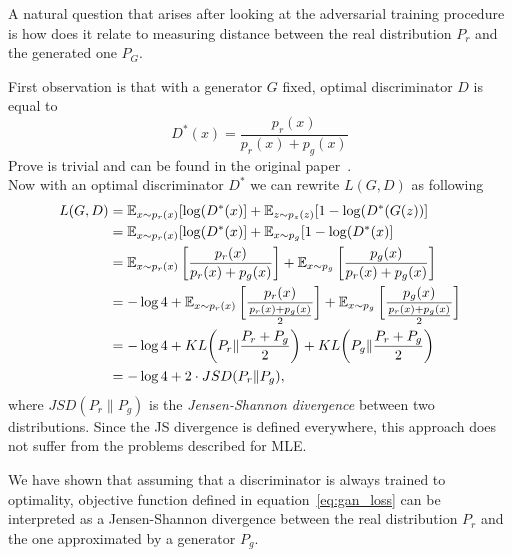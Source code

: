 \indent A natural question that arises after looking at the adversarial training procedure is how does it relate to measuring distance between the real distribution $P_r$ and the generated one $P_G$. 

First observation is that with a generator $G$ fixed, optimal discriminator $D$ is equal to
\begin{equation}
	D^*(x) = \frac{p_r(x)}{p_r(x) + p_g(x)}
\end{equation}
Prove is trivial and can be found in the original paper~\citep{gan}.\\
Now with an optimal discriminator $D^*$ we can rewrite $L(G,D)$ as following
\begin{align*}
	L(G, D) &= \operatorname{\mathbb{E}}_{x \sim p_r(x)} [\log(D^*(x)] + \operatorname{\mathbb{E}}_{z \sim p_z(z)}[1-\log(D^*(G(z))] \\
	&= \operatorname{\mathbb{E}}_{x \sim p_r(x)} [\log(D^*(x)] + \operatorname{\mathbb{E}}_{x \sim p_g}[1-\log(D^*(x)] \\
	&= \operatorname{\mathbb{E}}_{x \sim p_r(x)} \bigg[\frac{p_r(x)}{p_r(x) + p_g(x)}\bigg] + \operatorname{\mathbb{E}}_{x \sim p_g}\bigg[\frac{p_g(x)}{p_r(x) + p_g(x)}\bigg] \\
	&= -\log 4 + \operatorname{\mathbb{E}}_{x \sim p_r(x)} \bigg[\frac{p_r(x)}{\frac{p_r(x) + p_g(x)}{2}}\bigg] + \operatorname{\mathbb{E}}_{x \sim p_g}\bigg[\frac{p_g(x)}{\frac{p_r(x) + p_g(x)}{2}}\bigg] \\
	&= -\log 4 + KL\bigg(P_r \lVert \frac{P_r + P_g}{2}\bigg) +  KL\bigg(P_g \lVert \frac{P_r + P_g}{2}\bigg) \\
	&= -\log 4 + 2 \cdot JSD(P_r \lVert P_g),
\end{align*}
where $JSD(P_r \lVert P_g)$ is the \textit{Jensen-Shannon divergence} between two distributions. Since the JS divergence is defined everywhere, this approach does not suffer from the problems described for MLE.

\indent We have shown that assuming that a discriminator is always trained to optimality, objective function defined in equation~\eqref{eq:gan_loss} can be interpreted as a Jensen-Shannon divergence between the real distribution $P_r$ and the one approximated by a generator $P_g$. 

